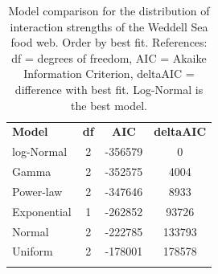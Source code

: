 \documentclass[gc, manuscript]{copernicus}
\begin{document}
\clearpage

\begin{table}[t]
\caption{Model comparison for the distribution of interaction strengths of the Weddell Sea food web. Order by best fit. References: df = degrees of freedom, AIC = Akaike Information Criterion, deltaAIC = difference with best fit. Log-Normal is the best model.}
\begin{tabular}{l c c c}
\tophline

\textbf{Model} & \textbf{df} & \textbf{AIC} & \textbf{deltaAIC} \\
\middlehline
log-Normal & 2 & -356579 & 0 \\
\middlehline
Gamma & 2 & -352575 & 4004 \\
\middlehline
Power-law & 2 & -347646 & 8933 \\
\middlehline
Exponential & 1 & -262852 & 93726 \\
\middlehline
Normal & 2 & -222785 & 133793 \\
\middlehline
Uniform & 2 & -178001 & 178578 \\

\bottomhline
\end{tabular}
\end{table}

\clearpage
\end{document}
